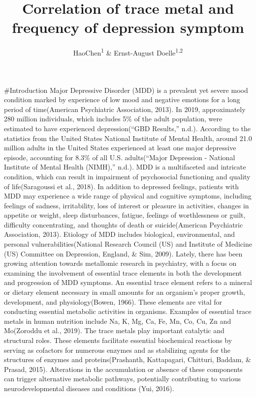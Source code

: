 \documentclass[
  man]{apa6}
\title{Correlation of trace metal and frequency of depression symptom}
\author{HaoChen\textsuperscript{1} \& Ernst-August Doelle\textsuperscript{1,2}}
\date{}
\affiliation{\vspace{0.5cm}\textsuperscript{1} University of Chicago\\\textsuperscript{2} Konstanz Business School}
\begin{document}
\maketitle

\#Introduction
Major Depressive Disorder (MDD) is a prevalent yet severe mood condition marked by experience of low mood and negative emotions for a long period of time(American Psychiatric Association, 2013). In 2019, approximately 280 million individuals, which includes 5\% of the adult population, were estimated to have experienced depression({``{GBD Results},''} n.d.). According to the statistics from the United States National Institute of Mental Health, around 21.0 million adults in the United States experienced at least one major depressive episode, accounting for 8.3\% of all U.S. adults({``Major {Depression} - {National Institute} of {Mental Health} ({NIMH}),''} n.d.).
MDD is a multifaceted and intricate condition, which can result in impairment of psychosocial functioning and quality of life(Saragoussi et al., 2018). In addition to depressed feelings, patients with MDD may experience a wide range of physical and cognitive symptoms, including feelings of sadness, irritability, loss of interest or pleasure in activities, changes in appetite or weight, sleep disturbances, fatigue, feelings of worthlessness or guilt, difficulty concentrating, and thoughts of death or suicide(American Psychiatric Association, 2013).
Etiology of MDD includes biological, environmental, and personal vulnerabilities(National Research Council (US) and Institute of Medicine (US) Committee on Depression, England, \& Sim, 2009). Lately, there has been growing attention towards metallomic research in psychiatry, with a focus on examining the involvement of essential trace elements in both the development and progression of MDD symptoms. An essential trace element refers to a mineral or dietary element necessary in small amounts for an organism's proper growth, development, and physiology(Bowen, 1966). These elements are vital for conducting essential metabolic activities in organisms. Examples of essential trace metals in human nutrition include Na, K, Mg, Ca, Fe, Mn, Co, Cu, Zn and Mo(Zoroddu et al., 2019). The trace metals play important catalytic and structural roles. These elements facilitate essential biochemical reactions by serving as cofactors for numerous enzymes and as stabilizing agents for the structures of enzymes and proteins(Prashanth, Kattapagari, Chitturi, Baddam, \& Prasad, 2015). Alterations in the accumulation or absence of these components can trigger alternative metabolic pathways, potentially contributing to various neurodevelopmental diseases and conditions (Yui, 2016).
\end{document}
